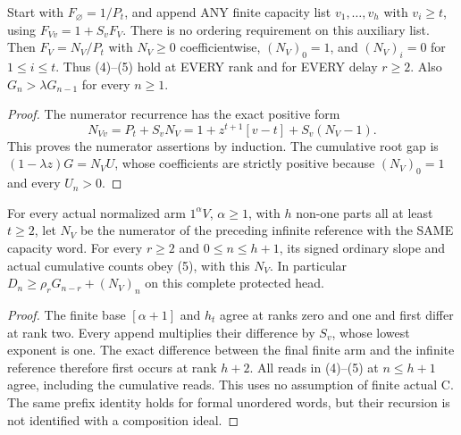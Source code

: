 \begin{corollary}
Start with $F_\varnothing=1/P_t$, and append ANY finite capacity list
$v_1,\ldots,v_h$ with $v_i\ge t$, using
$F_{Vv}=1+S_vF_V$. There is no ordering requirement on this auxiliary
list. Then $F_V=N_V/P_t$ with $N_V\ge0$ coefficientwise,
$(N_V)_0=1$, and $(N_V)_i=0$ for $1\le i\le t$.
Thus (4)--(5) hold at EVERY rank and for EVERY delay $r\ge2$.
Also $G_n>\lambda G_{n-1}$ for every $n\ge1$.
\end{corollary}
\begin{proof}
The numerator recurrence has the exact positive form
\[
 N_{Vv}=P_t+S_vN_V
     =1+z^{t+1}[v-t]+S_v(N_V-1).
\]
This proves the numerator assertions by induction. The cumulative
root gap is $(1-\lambda z)G=N_VU$, whose coefficients are strictly
positive because $(N_V)_0=1$ and every $U_n>0$.
\end{proof}

\begin{corollary}
For every actual normalized arm $1^\alpha V$, $\alpha\ge1$, with
$h$ non-one parts all at least $t\ge2$, let $N_V$ be the numerator
of the preceding infinite reference with the SAME capacity word.
For every $r\ge2$ and $0\le n\le h+1$, its signed ordinary slope
and actual cumulative counts obey (5), with this $N_V$. In particular
$D_n\ge\rho_rG_{n-r}+(N_V)_n$ on this complete protected head.
\end{corollary}
\begin{proof}
The finite base $[\alpha+1]$ and $h_t$ agree at ranks zero and one
and first differ at rank two. Every append multiplies their difference
by $S_v$, whose lowest exponent is one. The exact difference between
the final finite arm and the infinite reference therefore first occurs
at rank $h+2$. All reads in (4)--(5) at $n\le h+1$ agree, including
the cumulative reads. This uses no assumption of finite actual C.
The same prefix identity holds for formal unordered words, but their
recursion is not identified with a composition ideal.
\end{proof}

